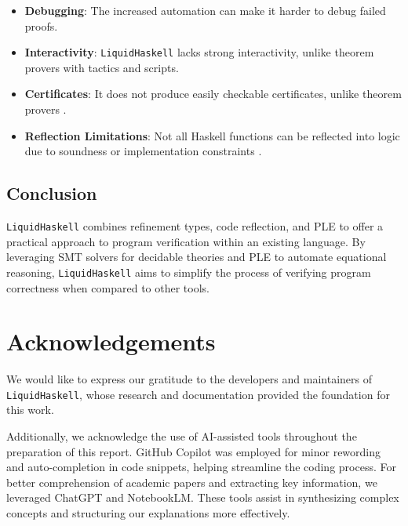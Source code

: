 \documentclass[]{rptuseminar}
\begin{document}
\begin{itemize}
    \item \textbf{Debugging}: The increased automation can make it harder to debug failed proofs.
    \item \textbf{Interactivity}: \texttt{LiquidHaskell} lacks strong interactivity, unlike theorem provers with tactics and scripts.
    \item \textbf{Certificates}: It does not produce easily checkable certificates, unlike theorem provers \cite{vazou_refinement_2018}.
    \item \textbf{Reflection Limitations}: Not all Haskell functions can be reflected into logic due to soundness or implementation constraints \cite{vazou_refinement_2018}.
\end{itemize}

\subsection*{Conclusion}

\texttt{LiquidHaskell} combines refinement types, code reflection, and PLE to offer a practical approach to program verification within an existing language. By leveraging SMT solvers for decidable theories and PLE to automate equational reasoning, \texttt{LiquidHaskell} aims to simplify the process of verifying program correctness when compared to other tools.
\label{sec:conclusions}
\newpage
\section*{Acknowledgements}
We would like to express our gratitude to the developers and maintainers of \texttt{LiquidHaskell}, whose research and 
documentation provided the foundation for this work.

Additionally, we acknowledge the use of AI-assisted tools throughout the preparation of this report. 
GitHub Copilot was employed for minor rewording and auto-completion in code snippets, 
helping streamline the coding process. For better comprehension of academic papers and extracting key information, 
we leveraged ChatGPT and NotebookLM. These tools assist in synthesizing complex concepts and structuring 
our explanations more effectively. 
\newpage
\nocite{*}



\end{document}
